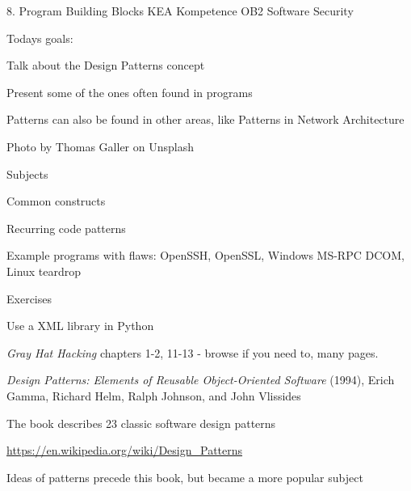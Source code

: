 \documentclass[Screen16to9,17pt]{foils}
\begin{document}
\mytitlepage
{8. Program Building Blocks}
{KEA Kompetence OB2 Software Security}




Todays goals:
\begin{list2}
\item Talk about the Design Patterns concept
\item Present some of the ones often found in programs
\item Patterns can also be found in other areas, like Patterns in Network Architecture
\end{list2}

  Photo by Thomas Galler on Unsplash


\begin{list1}
\item Subjects
\begin{list2}
\item Common constructs
\item Recurring code patterns
\item Example programs with flaws: OpenSSH, OpenSSL, Windows MS-RPC DCOM, Linux teardrop
\end{list2}
\item Exercises
\begin{list2}
\item Use a XML library in Python
\end{list2}
\end{list1}


\begin{list1}
\item \emph{Gray Hat Hacking} chapters 1-2, 11-13 - browse if you need to, many pages.
\end{list1}




\begin{list2}
\item \emph{Design Patterns: Elements of Reusable Object-Oriented Software} (1994), Erich Gamma, Richard Helm, Ralph Johnson, and John Vlissides

\item The book describes 23 classic software design patterns

\item \url{https://en.wikipedia.org/wiki/Design_Patterns}

\item Ideas of patterns precede this book, but became a more popular subject
\end{list2}
\end{document}
